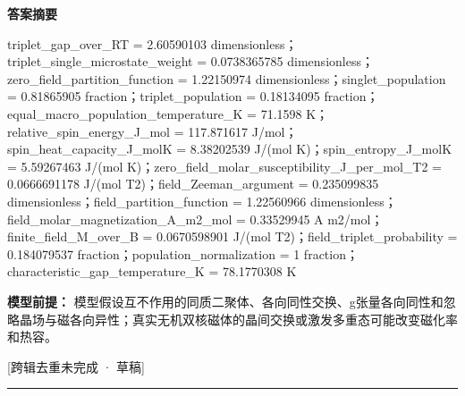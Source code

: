 \documentclass[UTF8,11pt,a4paper]{ctexart}
\begin{document}
\noindent\textbf{答案摘要}\par
triplet\_gap\_over\_RT = 2.60590103 dimensionless；triplet\_single\_microstate\_weight = 0.0738365785 dimensionless；zero\_field\_partition\_function = 1.22150974 dimensionless；singlet\_population = 0.81865905 fraction；triplet\_population = 0.18134095 fraction；equal\_macro\_population\_temperature\_K = 71.1598 K；relative\_spin\_energy\_J\_mol = 117.871617 J/mol；spin\_heat\_capacity\_J\_molK = 8.38202539 J/(mol K)；spin\_entropy\_J\_molK = 5.59267463 J/(mol K)；zero\_field\_molar\_susceptibility\_J\_per\_mol\_T2 = 0.0666691178 J/(mol T2)；field\_Zeeman\_argument = 0.235099835 dimensionless；field\_partition\_function = 1.22560966 dimensionless；field\_molar\_magnetization\_A\_m2\_mol = 0.33529945 A m2/mol；finite\_field\_M\_over\_B = 0.0670598901 J/(mol T2)；field\_triplet\_probability = 0.184079537 fraction；population\_normalization = 1 fraction；characteristic\_gap\_temperature\_K = 78.1770308 K\par
\noindent\textbf{模型前提：}
模型假设互不作用的同质二聚体、各向同性交换、g张量各向同性和忽略晶场与磁各向异性；真实无机双核磁体的晶间交换或激发多重态可能改变磁化率和热容。\par
\noindent\textcolor{red!65!black}{[跨辑去重未完成 · 草稿]} \par
\medskip\hrule\medskip
{}
\end{document}
